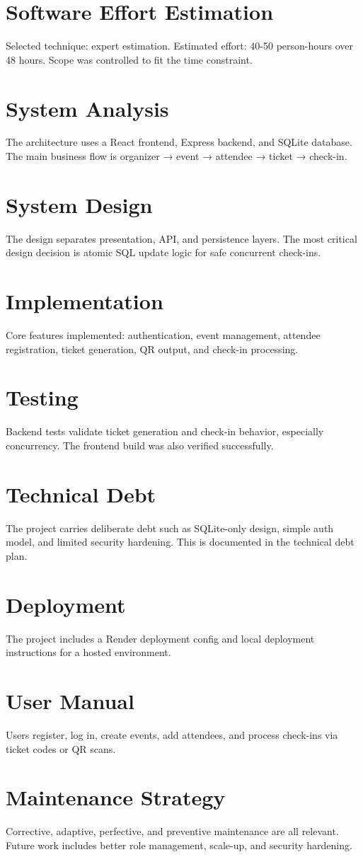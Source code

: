 \documentclass[11pt]{article}
\begin{document}
\section{Software Effort Estimation}
Selected technique: expert estimation. Estimated effort: 40-50 person-hours over 48 hours. Scope was controlled to fit the time constraint.
\section{System Analysis}
The architecture uses a React frontend, Express backend, and SQLite database. The main business flow is organizer → event → attendee → ticket → check-in.
\section{System Design}
The design separates presentation, API, and persistence layers. The most critical design decision is atomic SQL update logic for safe concurrent check-ins.
\section{Implementation}
Core features implemented: authentication, event management, attendee registration, ticket generation, QR output, and check-in processing.
\section{Testing}
Backend tests validate ticket generation and check-in behavior, especially concurrency. The frontend build was also verified successfully.
\section{Technical Debt}
The project carries deliberate debt such as SQLite-only design, simple auth model, and limited security hardening. This is documented in the technical debt plan.
\section{Deployment}
The project includes a Render deployment config and local deployment instructions for a hosted environment.
\section{User Manual}
Users register, log in, create events, add attendees, and process check-ins via ticket codes or QR scans.
\section{Maintenance Strategy}
Corrective, adaptive, perfective, and preventive maintenance are all relevant. Future work includes better role management, scale-up, and security hardening.
\end{document}
